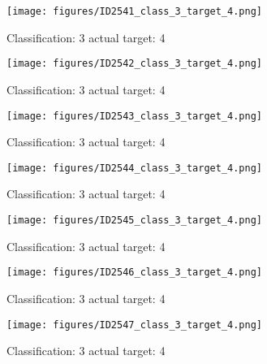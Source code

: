 \begin{figure}[h!]
\begin{center}
\texttt{[image: figures/ID2541\_class\_3\_target\_4.png]}
\end{center}
\caption{ Classification: 3 actual target: 4}
\label{fig:ID2541_class_3_target_4}
\end{figure}
\begin{figure}[h!]
\begin{center}
\texttt{[image: figures/ID2542\_class\_3\_target\_4.png]}
\end{center}
\caption{ Classification: 3 actual target: 4}
\label{fig:ID2542_class_3_target_4}
\end{figure}
\begin{figure}[h!]
\begin{center}
\texttt{[image: figures/ID2543\_class\_3\_target\_4.png]}
\end{center}
\caption{ Classification: 3 actual target: 4}
\label{fig:ID2543_class_3_target_4}
\end{figure}
\begin{figure}[h!]
\begin{center}
\texttt{[image: figures/ID2544\_class\_3\_target\_4.png]}
\end{center}
\caption{ Classification: 3 actual target: 4}
\label{fig:ID2544_class_3_target_4}
\end{figure}
\begin{figure}[h!]
\begin{center}
\texttt{[image: figures/ID2545\_class\_3\_target\_4.png]}
\end{center}
\caption{ Classification: 3 actual target: 4}
\label{fig:ID2545_class_3_target_4}
\end{figure}
\begin{figure}[h!]
\begin{center}
\texttt{[image: figures/ID2546\_class\_3\_target\_4.png]}
\end{center}
\caption{ Classification: 3 actual target: 4}
\label{fig:ID2546_class_3_target_4}
\end{figure}
\begin{figure}[h!]
\begin{center}
\texttt{[image: figures/ID2547\_class\_3\_target\_4.png]}
\end{center}
\caption{ Classification: 3 actual target: 4}
\label{fig:ID2547_class_3_target_4}
\end{figure}
